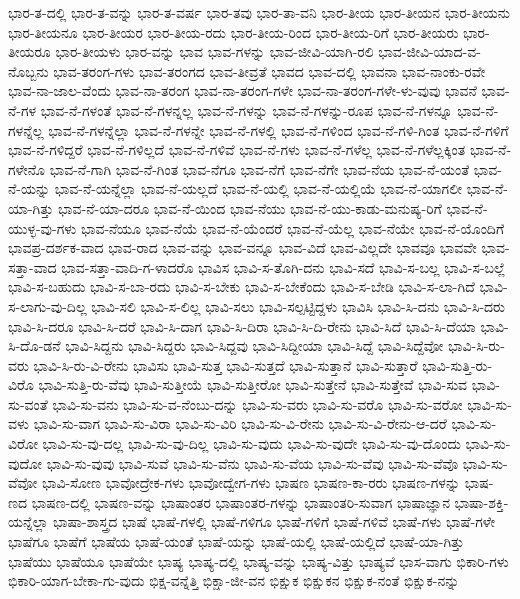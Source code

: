 {ಭಾರ-ತ-ದಲ್ಲಿ
ಭಾರ-ತ-ವನ್ನು
ಭಾರ-ತ-ವರ್ಷ
ಭಾರ-ತವು
ಭಾರ-ತಾ-ವನಿ
ಭಾರ-ತೀಯ
ಭಾರ-ತೀಯನ
ಭಾರ-ತೀಯನು
ಭಾರ-ತೀಯನೂ
ಭಾರ-ತೀಯರ
ಭಾರ-ತೀಯ-ರದು
ಭಾರ-ತೀಯ-ರಿಂದ
ಭಾರ-ತೀಯ-ರಿಗೆ
ಭಾರ-ತೀಯರು
ಭಾರ-ತೀಯರೂ
ಭಾರ-ತೀಯಳು
ಭಾರ-ವನ್ನು
ಭಾವ
ಭಾವ-ಗಳನ್ನು
ಭಾವ-ಜೀವಿ-ಯಾಗಿ-ರಲಿ
ಭಾವ-ಜೀವಿ-ಯಾದ-ವ-ನೊಬ್ಬನು
ಭಾವ-ತರಂಗ-ಗಳು
ಭಾವ-ತರಂಗದ
ಭಾವ-ತೀವ್ರತೆ
ಭಾವದ
ಭಾವ-ದಲ್ಲಿ
ಭಾವನಾ
ಭಾವ-ನಾಂಕು-ರವೇ
ಭಾವ-ನಾ-ಜಾಲ-ವೆಂದು
ಭಾವ-ನಾ-ತರಂಗ
ಭಾವ-ನಾ-ತರಂಗ-ಗಳೇ
ಭಾವ-ನಾ-ತರಂಗ-ಗಳೇ-ಳು-ವುವು
ಭಾವನೆ
ಭಾವ-ನೆ-ಗಳ
ಭಾವ-ನೆ-ಗಳಂತೆ
ಭಾವ-ನೆ-ಗಳನ್ನಲ್ಲ
ಭಾವ-ನೆ-ಗಳನ್ನು
ಭಾವ-ನೆ-ಗಳನ್ನು-ರೂಪ
ಭಾವ-ನೆ-ಗಳನ್ನೂ
ಭಾವ-ನೆ-ಗಳನ್ನೆಲ್ಲ
ಭಾವ-ನೆ-ಗಳನ್ನೆಲ್ಲಾ
ಭಾವ-ನೆ-ಗಳನ್ನೇ
ಭಾವ-ನೆ-ಗಳಲ್ಲಿ
ಭಾವ-ನೆ-ಗಳಿಂದ
ಭಾವ-ನೆ-ಗಳಿ-ಗಿಂತ
ಭಾವ-ನೆ-ಗಳಿಗೆ
ಭಾವ-ನೆ-ಗಳಿದ್ದರೆ
ಭಾವ-ನೆ-ಗಳಿಲ್ಲದೆ
ಭಾವ-ನೆ-ಗಳಿವೆ
ಭಾವ-ನೆ-ಗಳು
ಭಾವ-ನೆ-ಗಳೆಲ್ಲ
ಭಾವ-ನೆ-ಗಳೆಲ್ಲಕ್ಕಿಂತ
ಭಾವ-ನೆ-ಗಳೇನೊ
ಭಾವ-ನೆ-ಗಾಗಿ
ಭಾವ-ನೆ-ಗಿಂತ
ಭಾವ-ನೆಗೂ
ಭಾವ-ನೆಗೆ
ಭಾವ-ನೆಗೇ
ಭಾವ-ನೆಯ
ಭಾವ-ನೆ-ಯಂತೆ
ಭಾವ-ನೆ-ಯನ್ನು
ಭಾವ-ನೆ-ಯನ್ನೆಲ್ಲಾ
ಭಾವ-ನೆ-ಯಲ್ಲದೆ
ಭಾವ-ನೆ-ಯಲ್ಲಿ
ಭಾವ-ನೆ-ಯಲ್ಲಿಯೆ
ಭಾವ-ನೆ-ಯಾಗಲೀ
ಭಾವ-ನೆ-ಯಾ-ಗಿತ್ತು
ಭಾವ-ನೆ-ಯಾ-ದರೂ
ಭಾವ-ನೆ-ಯಿಂದ
ಭಾವ-ನೆಯು
ಭಾವ-ನೆ-ಯು-ಕಾಡು-ಮನುಷ್ಯ-ರಿಗೆ
ಭಾವ-ನೆ-ಯುಳ್ಳ-ವು-ಗಳು
ಭಾವ-ನೆಯೂ
ಭಾವ-ನೆಯೆ
ಭಾವ-ನೆ-ಯೆಂದರೆ
ಭಾವ-ನೆ-ಯೆಲ್ಲ
ಭಾವ-ನೆಯೇ
ಭಾವ-ನೆ-ಯೊಂದಿಗೆ
ಭಾವಪ್ರ-ದರ್ಶಕ-ವಾದ
ಭಾವ-ರಾದ
ಭಾವ-ವನ್ನು
ಭಾವ-ವನ್ನೂ
ಭಾವ-ವಿದೆ
ಭಾವ-ವಿಲ್ಲದೇ
ಭಾವವೂ
ಭಾವವೇ
ಭಾವ-ಸತ್ತಾ-ವಾದ
ಭಾವ-ಸತ್ತಾ-ವಾದಿ-ಗ-ಳಾದರೊ
ಭಾವಿಸ
ಭಾವಿ-ಸ-ತೊಗಿ-ದನು
ಭಾವಿ-ಸದೆ
ಭಾವಿ-ಸ-ಬಲ್ಲ
ಭಾವಿ-ಸ-ಬಲ್ಲೆ
ಭಾವಿ-ಸ-ಬಹುದು
ಭಾವಿ-ಸ-ಬಾ-ರದು
ಭಾವಿ-ಸ-ಬೇಕು
ಭಾವಿ-ಸ-ಬೇಕೆಂದು
ಭಾವಿ-ಸ-ಬೇಡಿ
ಭಾವಿ-ಸ-ಲಾ-ಗಿದೆ
ಭಾವಿ-ಸ-ಲಾಗು-ವು-ದಿಲ್ಲ
ಭಾವಿ-ಸಲಿ
ಭಾವಿ-ಸ-ಲಿಲ್ಲ
ಭಾವಿ-ಸಲು
ಭಾವಿ-ಸಲ್ಪಟ್ಟಿದ್ದಳು
ಭಾವಿಸಿ
ಭಾವಿ-ಸಿ-ದನು
ಭಾವಿ-ಸಿ-ದರು
ಭಾವಿ-ಸಿ-ದರೂ
ಭಾವಿ-ಸಿ-ದರೆ
ಭಾವಿ-ಸಿ-ದಾಗ
ಭಾವಿ-ಸಿ-ದಿರಾ
ಭಾವಿ-ಸಿ-ದಿ-ರೇನು
ಭಾವಿ-ಸಿದೆ
ಭಾವಿ-ಸಿ-ದೆಯಾ
ಭಾವಿ-ಸಿ-ದೊ-ಡನೆ
ಭಾವಿ-ಸಿದ್ದನು
ಭಾವಿ-ಸಿದ್ದರು
ಭಾವಿ-ಸಿದ್ದವು
ಭಾವಿ-ಸಿದ್ದೀಯಾ
ಭಾವಿ-ಸಿದ್ದೆ
ಭಾವಿ-ಸಿದ್ದೆವೋ
ಭಾವಿ-ಸಿ-ರು-ವರು
ಭಾವಿ-ಸಿ-ರು-ವಿ-ರೇನು
ಭಾವಿಸು
ಭಾವಿ-ಸುತ್ತ
ಭಾವಿ-ಸುತ್ತದೆ
ಭಾವಿ-ಸುತ್ತಾನೆ
ಭಾವಿ-ಸುತ್ತಾರೆ
ಭಾವಿ-ಸುತ್ತಿ-ರು-ವಿರೊ
ಭಾವಿ-ಸುತ್ತಿ-ರು-ವೆವು
ಭಾವಿ-ಸುತ್ತೀಯೆ
ಭಾವಿ-ಸುತ್ತೀರೋ
ಭಾವಿ-ಸುತ್ತೇನೆ
ಭಾವಿ-ಸುತ್ತೇವೆ
ಭಾವಿ-ಸುವ
ಭಾವಿ-ಸು-ವಂತೆ
ಭಾವಿ-ಸು-ವನು
ಭಾವಿ-ಸು-ವ-ನೆಂಬು-ದನ್ನು
ಭಾವಿ-ಸು-ವರು
ಭಾವಿ-ಸು-ವರೊ
ಭಾವಿ-ಸು-ವರೋ
ಭಾವಿ-ಸು-ವಳು
ಭಾವಿ-ಸು-ವಾಗ
ಭಾವಿ-ಸು-ವಿರಾ
ಭಾವಿ-ಸು-ವಿರಿ
ಭಾವಿ-ಸು-ವಿ-ರೇನು
ಭಾವಿ-ಸು-ವಿ-ರೇನು-ಆ-ದರೆ
ಭಾವಿ-ಸು-ವಿರೋ
ಭಾವಿ-ಸು-ವು-ದಲ್ಲ
ಭಾವಿ-ಸು-ವು-ದಿಲ್ಲ
ಭಾವಿ-ಸು-ವುದು
ಭಾವಿ-ಸು-ವುದೇ
ಭಾವಿ-ಸು-ವು-ದೊಂದು
ಭಾವಿ-ಸು-ವುದೋ
ಭಾವಿ-ಸು-ವುವು
ಭಾವಿ-ಸುವೆ
ಭಾವಿ-ಸು-ವೆನು
ಭಾವಿ-ಸು-ವೆಯ
ಭಾವಿ-ಸು-ವೆವು
ಭಾವಿ-ಸು-ವೆವೊ
ಭಾವಿ-ಸು-ವೆವೋ
ಭಾವಿ-ಸೋಣ
ಭಾವೋದ್ರೇಕ-ಗಳು
ಭಾವೋದ್ವೇಗ-ಗಳು
ಭಾಷಣ
ಭಾಷಣ-ಕಾ-ರರು
ಭಾಷಣ-ಗಳನ್ನು
ಭಾಷ-ಣದ
ಭಾಷಣ-ದಲ್ಲಿ
ಭಾಷಣ-ವನ್ನು
ಭಾಷಾಂತರ
ಭಾಷಾಂತರ-ಗಳನ್ನು
ಭಾಷಾಂತರಿ-ಸುವಾಗ
ಭಾಷಾಜ್ಞಾನ
ಭಾಷಾ-ಶಕ್ತಿ-ಯನ್ನೆಲ್ಲಾ
ಭಾಷಾ-ಶಾಸ್ತ್ರದ
ಭಾಷೆ
ಭಾಷೆ-ಗಳಲ್ಲಿ
ಭಾಷೆ-ಗಳಿಗೂ
ಭಾಷೆ-ಗಳಿಗೆ
ಭಾಷೆ-ಗಳಿವೆ
ಭಾಷೆ-ಗಳು
ಭಾಷೆ-ಗಳೇ
ಭಾಷೆಗೂ
ಭಾಷೆಗೆ
ಭಾಷೆಯ
ಭಾಷೆ-ಯಂತೆ
ಭಾಷೆ-ಯನ್ನು
ಭಾಷೆ-ಯಲ್ಲಿ
ಭಾಷೆ-ಯಲ್ಲಿದೆ
ಭಾಷೆ-ಯಾ-ಗಿತ್ತು
ಭಾಷೆಯು
ಭಾಷೆಯೂ
ಭಾಷೆಯೇ
ಭಾಷ್ಯ
ಭಾಷ್ಯ-ದಲ್ಲಿ
ಭಾಷ್ಯ-ವನ್ನು
ಭಾಷ್ಯ-ವಿತ್ತು
ಭಾಷ್ಯವೆ
ಭಾಸ-ವಾಗು
ಭಿಕಾರಿ-ಗಳು
ಭಿಕಾರಿ-ಯಾಗ-ಬೇಕಾ-ಗು-ವುದು
ಭಿಕ್ಷ-ವನ್ನೆತ್ತಿ
ಭಿಕ್ಷಾ-ಜೀ-ವನ
ಭಿಕ್ಷುಕ
ಭಿಕ್ಷುಕನ
ಭಿಕ್ಷುಕ-ನಂತೆ
ಭಿಕ್ಷುಕ-ನನ್ನು
}
